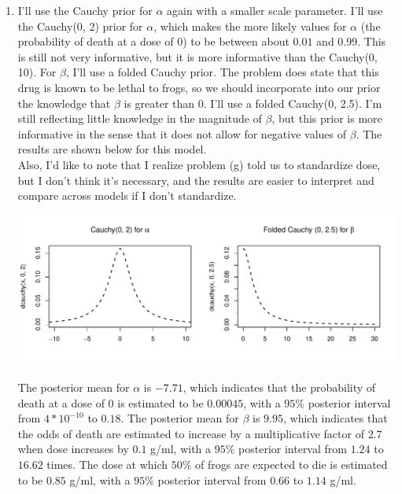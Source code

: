 \documentclass[12pt]{article}\usepackage[]{graphicx}\usepackage[]{color}
\newenvironment{knitrout}{}{} %
\begin{document}
\begin{enumerate}
\begin{enumerate}
\item I'll use the Cauchy prior for $\alpha$ again with a smaller scale parameter. I'll use the Cauchy(0, 2) prior for $\alpha$, which makes the more likely values for $\alpha$ (the probability of death at a dose of $0$) to be between about $0.01$ and $0.99$. This is still not very informative, but it is more informative than the Cauchy(0, 10). For $\beta$, I'll use a folded Cauchy prior. The problem does state that this drug is known to be lethal to frogs, so we should incorporate into our prior the knowledge that $\beta$ is greater than $0$. I'll use a folded Cauchy(0, 2.5). I'm still reflecting little knowledge in the magnitude of $\beta$, but this prior is more informative in the sense that it does not allow for negative values of $\beta$. The results are shown below for this model. \\

Also, I'd like to note that I realize problem (g) told us to standardize dose, but I don't think it's necessary, and the results are easier to interpret and compare across models if I don't standardize.

\begin{knitrout}\footnotesize
{}\color{fgcolor}
\includegraphics[width=\linewidth]{figure/cauchyagain-1} 

\end{knitrout}




The posterior mean for $\alpha$ is $-7.71$, which indicates that the probability of death at a dose of $0$ is estimated to be $0.00045$, with a $95\%$ posterior interval from $4*10^{-10}$ to $0.18$. The posterior mean for $\beta$ is $9.95$, which indicates that the odds of death are estimated to increase by a multiplicative factor of $2.7$ when dose increases by $0.1$ g/ml, with a $95\%$ posterior interval from $1.24$ to $16.62$ times. The dose at which $50\%$ of frogs are expected to die is estimated to be $0.85$ g/ml, with a $95\%$ posterior interval from $0.66$ to $1.14$ g/ml.



\end{enumerate}
\end{enumerate}
\end{document}
